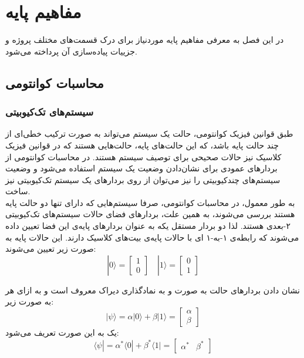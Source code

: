 \chapter{مفاهیم پایه}
در این فصل به معرفی مفاهیم پایه موردنیاز برای درک قسمت‌های مختلف پروژه و جزییات پیاده‌سازی آن پرداخته می‌شود.

\newcommand{\dd}[1]{\mathrm{d}#1}


\section{محاسبات کوانتومی}

\subsection{سیستم‌های تک‌کیوبیتی}

طبق قوانین فیزیک کوانتومی، حالت یک سیستم می‌تواند به صورت ترکیب خطی‌ای از چند حالت پایه باشد، که این حالت‌های پایه، حالت‌هایی هستند که در قوانین فیزیک کلاسیک نیز حالات صحیحی برای توصیف سیستم هستند.
در محاسبات کوانتومی از بردارهای عمودی برای نشان‌دادن وضعیت یک سیستم استفاده می‌شود و وضعیت سیستم‌های چندکیوبیتی را نیز می‌توان از روی بردارهای یک سیستم تک‌کیوبیتی نیز ساخت.
\\
به طور معمول، در محاسبات کوانتومی، صرفا سیستم‌هایی که دارای تنها دو حالت پایه هستند بررسی می‌شوند، به همین علت، بردارهای فضای حالات سیستم‌های تک‌کیوبیتی ۲-بعدی هستند. لذا دو بردار مستقل یکه به عنوان بردارهای پایه‌ی این فضا تعیین داده می‌شوند که رابطه‌ی ۱-به-۱ ای با حالات پایه‌ی بیت‌های کلاسیک دارند.
این حالات پایه به صورت زیر تعیین می‌شوند:
\begin{equation}
    |0\rangle = \begin{bmatrix} 1 \\ 0 \end{bmatrix} 
    \mspace{18mu}
    |1\rangle = \begin{bmatrix} 0 \\ 1 \end{bmatrix}
\end{equation} 

نشان دادن بردارهای حالت به صورت 
\lr{$|0\rangle$} و \lr{$|1\rangle$}
به نمادگذاری  دیراک
معروف است و به ازای هر
به صورت زیر:
\begin{equation}
    |\psi\rangle = \alpha |0\rangle + \beta |1\rangle
    = \begin{bmatrix}
    \alpha \\[3pt]
    \beta
    \end{bmatrix}
\end{equation}
یک 
به این صورت تعریف می‌شود:
\begin{equation}
    \langle \psi| = \alpha^* \langle0| + \beta^* \langle1| = \begin{bmatrix} \alpha^* & \beta^* \end{bmatrix} 
\end{equation}

